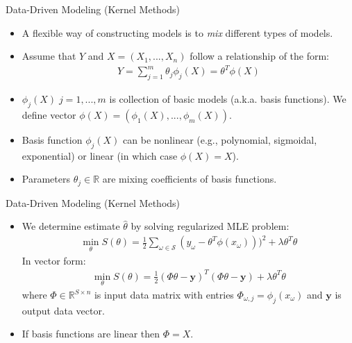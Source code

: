 \documentclass[9pt]{beamer}
\begin{document}
\begin{frame}{Data-Driven Modeling (Kernel Methods)}
\begin{itemize}
\item A flexible way of constructing models is to {\em mix} different types of models.  
\item Assume that $Y$ and $X=(X_1,...,X_n)$ follow a relationship of the form:
\begin{align*}
Y=\sum_{j=1}^m\theta_j \phi_j(X)=\theta^T\phi(X)
\end{align*}
\item $\phi_j(X)\; j=1,...,m$ is collection of basic models (a.k.a. basis functions). We define vector $\phi(X)=(\phi_1(X),...,\phi_m(X))$. 
\item Basis function $\phi_j(X)$ can be nonlinear (e.g., polynomial, sigmoidal, exponential) or linear (in which case $\phi(X)=X$). 

\item Parameters $\theta_j\in \mathbb{R}$ are mixing coefficients of basis functions.  

\end{itemize}

\end{frame}


\begin{frame}{Data-Driven Modeling (Kernel Methods)}
\begin{itemize}

\item We determine estimate $\hat{\theta}$ by solving regularized MLE problem:
\begin{align*}
\min_{\theta} S(\theta)= \frac{1}{2}\sum_{\omega \in \mathcal{S}}(y_\omega-\theta^T\phi(x_\omega)))^2+\lambda \theta^T\theta
\end{align*}
In vector form:
\begin{align*}
\min_{\theta} S(\theta)= \frac{1}{2}(\Phi\theta -\mathbf{y})^T(\Phi\theta-\mathbf{y})+\lambda\theta^T\theta
\end{align*}
where $\Phi\in \mathbb{R}^{S\times n}$ is input data matrix with entries $\Phi_{\omega,j}=\phi_{j}(x_\omega)$ and $\mathbf{y}$ is output data vector. 

\item If basis functions are linear then $\Phi=X$. 

\end{itemize}

\end{frame}
\end{document}
